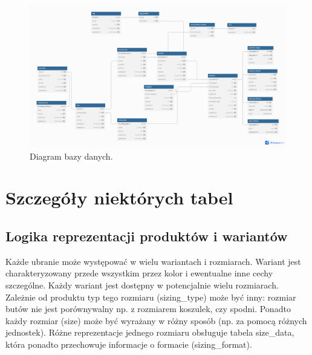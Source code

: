 




\begin{figure}[h] %
    \centering %
    \includegraphics[width=1.0\textwidth]{diagram.png} %
    \caption{Diagram bazy danych.} %
    \label{fig:example} %
\end{figure}

\section*{Szczegóły niektórych tabel}

\subsection*{Logika reprezentacji produktów i wariantów}
Każde ubranie może występować w wielu wariantach i rozmiarach. Wariant jest charakteryzowany przede wszystkim przez kolor i ewentualne inne cechy szczególne. Każdy wariant jest dostępny w potencjalnie wielu rozmiarach. Zależnie od produktu typ tego rozmiaru (sizing\_type) może być inny: rozmiar butów nie jest porównywalny np. z rozmiarem koszulek, czy spodni. Ponadto każdy rozmiar (size) może być wyrażany w różny sposób (np. za pomocą różnych jednostek). Różne reprezentacje jednego rozmiaru obsługuje tabela size\_data, która ponadto przechowuje informacje o formacie (sizing\_format).

